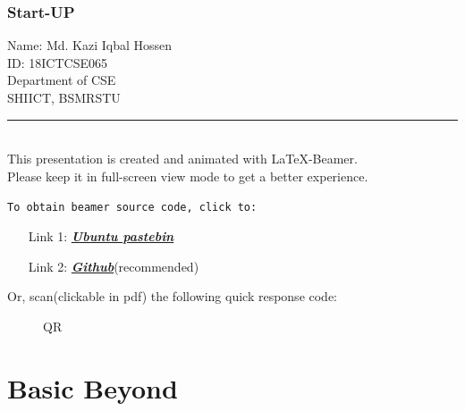 \documentclass[9 pt]{beamer}
\begin{document}
\begin{frame}
    \frametitle{Start-UP}
    \begin{center}
        Name: Md. Kazi Iqbal Hossen\\
        ID: 18ICTCSE065\\
        Department of CSE\\
        SHIICT, BSMRSTU\\
        \textcolor{green}{\rule{10.5 cm}{3 pt}} \\
        \alert
        {
            This presentation is created and animated with \LaTeX{}-Beamer. \\
            Please keep it in full-screen view mode to get a better experience.
        }
    \end{center}
    \vfill
    \texttt{To obtain beamer source code, click to:}
    \begin{itemize}
        \item[Link 1:] \href{https://pastebin.ubuntu.com/p/dY8TWXY24C/}{\textit{\textbf{Ubuntu pastebin}}}
        \item[Link 2:] \href{https://github.com/Sofiullah-Iqbal-Kiron/LaTeX/blob/master/Presentation/Beamer/MAT205\%20Mid/MAT205\%20Mid.tex}{\textit{\textbf{Github}}}{\tiny (recommended)}
    \end{itemize}
    Or, scan{\footnotesize(clickable in pdf)} the following quick response code:
    \begin{figure}
        \caption*{QR} %
        \centering
    \end{figure}
    \transsplitverticalout[duration=2]
\end{frame}


\section{Basic Beyond}
\end{document}
